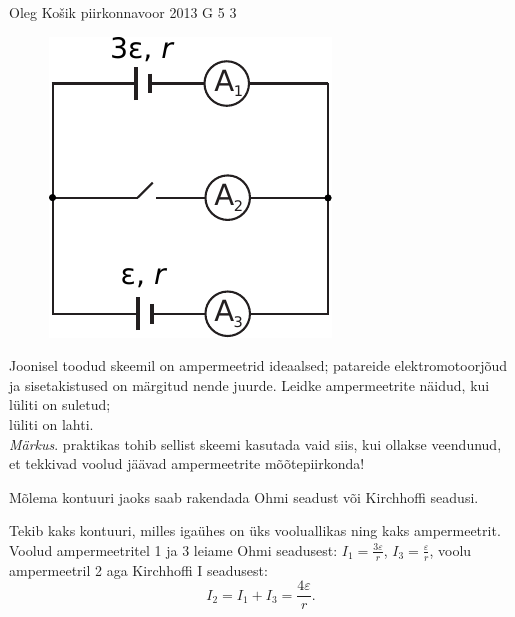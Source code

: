 {Oleg Košik} %
{piirkonnavoor} %
{2013} %
{G 5} %
{3} %
{
\ifStatement
\begin{figure}%
\vspace{-10pt}
\includegraphics[width=\linewidth]{2013-v2g-05-skeem}%
\end{figure}
Joonisel toodud skeemil on ampermeetrid ideaalsed; patareide elektromotoorjõud
ja sisetakistused on märgitud nende juurde. Leidke ampermeetrite näidud, kui\\
\osa lüliti on suletud;\\
\osa lüliti on lahti.\\
\emph{Märkus}. praktikas tohib
sellist skeemi kasutada vaid siis, kui ollakse veendunud, et tekkivad voolud
jäävad ampermeetrite mõõtepiirkonda!
\fi


\ifHint
Mõlema kontuuri jaoks saab rakendada Ohmi seadust või Kirchhoffi seadusi.
\fi


\ifSolution
\osa Tekib kaks kontuuri, milles igaühes on üks vooluallikas ning kaks ampermeetrit. Voolud ampermeetritel 1 ja 3 leiame Ohmi seadusest: $I_1=\frac{3\varepsilon}{r}$, $I_3=\frac{\varepsilon}{r}$, voolu ampermeetril 2 aga Kirchhoffi I seadusest: 
\[
I_2=I_1+I_3=\frac{4\varepsilon}{r}.
\]

}
